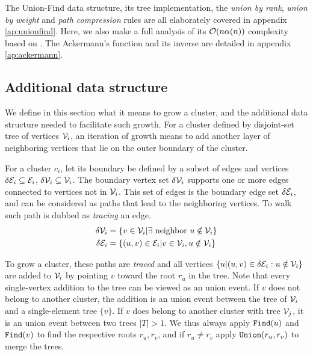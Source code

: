 The Union-Find data structure, its tree implementation, the \emph{union by rank}, \emph{union by weight} and \emph{path compression} rules are all elaborately covered in appendix \ref{ap:unionfind}. Here, we also make a full analysis of its $\mathcal{O}(n\alpha(n))$ complexity based on \cite{kozen1992design}. The Ackermann's function and its inverse are detailed in appendix \ref{ap:ackermann}.

\subsection{Additional data structure}
We define in this section what it means to grow a cluster, and the additional data structure needed to facilitate such growth. For a cluster defined by disjoint-set tree of vertices $\mathcal{V}_i$, an iteration of growth means to add another layer of neighboring vertices that lie on the outer boundary of the cluster. 
\begin{definition}\label{def:clusterboud}
  For a cluster $c_i$, let its boundary be defined by a subset of edges and vertices $\delta \mathcal{E}_i \subseteq \mathcal{E}_i$, $\delta \mathcal{V}_i \subseteq \mathcal{V}_i$. The boundary vertex set $\delta \mathcal{V}_i$ supports one or more edges connected to vertices not in $\mathcal{V}_i$. This set of edges is the boundary edge set $\delta \mathcal{E}_i$, and can be considered as paths that lead to the neighboring vertices. To walk such path is dubbed as \emph{tracing} an edge. 
  \begin{align}
    \delta \mathcal{V}_i&= \left\{ v \in \mathcal{V}_i | \exists \text{ neighbor }  u \notin \mathcal{V}_i \right\} \\
    \delta \mathcal{E}_i &= \{(u,v)\in \mathcal{E}_i | v \in \mathcal{V}_i, u \notin \mathcal{V}_i \}
  \end{align}
\end{definition}
To grow a cluster, these paths are \emph{traced} and all vertices $\{u | (u,v) \in \delta \mathcal{E}_i: u \notin \mathcal{V}_i\}$ are added to $\mathcal{V}_i$ by pointing $v$ toward the root $r_u$ in the tree. Note that every single-vertex addition to the tree can be viewed as an union event. If $v$ does not belong to another cluster, the addition is an union event between the tree of $\mathcal{V}_i$ and a single-element tree $\{v\}$. If $v$ does belong to another cluster with tree $\mathcal{V}_j$, it is an union event between two trees $|T|>1$. We thus always apply $\texttt{Find}(u)$ and $\texttt{Find}(v)$ to find the respective roots $r_u, r_v$, and if $r_u\neq r_v$ apply $\texttt{Union}(r_u, r_v)$ to merge the trees.

